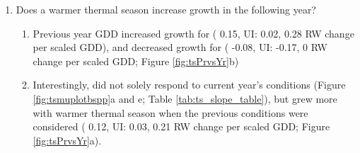 \begin{enumerate}
\begin{enumerate}
  \item No clear trend of growing season length effect across our eleven species and season predictors. %
  \item Results reported as means and 90\% uncertainty intervals (UI) that correspond to ring width change in mm on the log scale---henseforth "RW" per scaled predictor (one week (seven days) of average spring growing degree days (GDD); (58.32) for the thermal season, one week of growing season length (GSL) for the calendar season, one week of leafout for the start of season (SOS) and one week of of budset for the end of season (EOS). %

  \item Longer thermal season did not increase growth for any species and decreased growth for {\Ball} (
  -0.08, UI:
  -0.12,
  -0.03 RW change per scaled GDD; Figure \ref{fig:tsmuplotbspp}a and e; Table \ref{tab:ts_slope_table}).
  
  \item No species responded to longer calendar season (Figure \ref{fig:tsmuplotbspp}b and f; Table \ref{tab:ts_slope_table}).

  \item On a scaled axis (z-scored), both GDD and GSL were similarly predictive (Figure \ref{fig:bsppZscored})

  \end{enumerate}

\item Does a warmer thermal season increase growth in the following year?
  \begin{enumerate}
  
  \item Previous year GDD increased growth for {\Ball} (
  0.15, UI:
  0.02,
  0.28 RW change per scaled GDD),
  and decreased growth for {\Bnig} (
  -0.08, UI:
  -0.17,
  0 RW change per scaled GDD; Figure \ref{fig:tsPrvsYr}b)
  
  \item Interestingly, {\Bnig} did not solely respond to current year's conditions (Figure \ref{fig:tsmuplotbspp}a and e; Table \ref{tab:ts_slope_table}), but grew more with warmer thermal season when the previous conditions were considered (
  0.12, UI:
  0.03,
  0.21 RW change per scaled GDD; Figure \ref{fig:tsPrvsYr}a).
  

\end{enumerate}
\end{enumerate}
